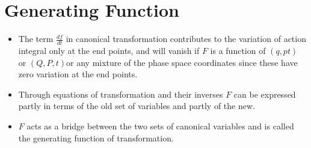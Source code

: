 \section{Generating Function}
\begin{itemize}
	\item The term $\frac{df}{dt}$ in canonical transformation contributes to the variation of action integral only at the end points, and will vanish if $F$ is a function of $(q,p t)$ or $(Q,P,t)$or any mixture of the phase space coordinates since these have zero variation at the end points.
	\item Through equations of transformation and their inverses $F$ can be expressed partly in terms of the old set of variables and partly of the new.
	\item $F$ acts as a bridge between the two sets of canonical variables and is called the generating function of transformation.
\end{itemize}